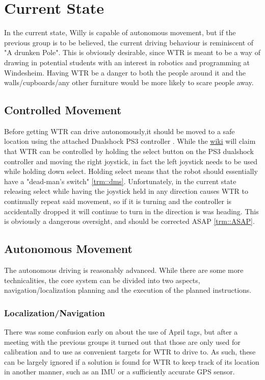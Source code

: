 \section{Current State}
In the current state, Willy is capable of autonomous movement, but if the previous group is to be believed, the current driving behaviour is reminiscent of "A drunken Pole".
This is obviously desirable, since WTR is meant to be a way of drawing in potential students with an interest in robotics and programming at Windesheim.
Having WTR be a danger to both the people around it and the walls/cupboards/any other furniture would be more likely to scare people away.

\subsection{Controlled Movement}
Before getting WTR can drive autonomously,it should be moved to a safe location using the attached Dualshock PS3 controller \cite{dualshock}.
While the \href{ https://windesheim-willy.github.io/WillyWiki/components/joystick.html}{wiki} will claim that WTR can be controlled by holding the select button on the PS3 dualshock controller and moving the right joystick, in fact the left joystick needs to be used while holding down select.
Holding select means that the robot should essentially have a "dead-man's switch" \ref{trm::dms}.
Unfortunately, in the current state releasing select while having the joystick held in any direction causes WTR to continually repeat said movement, so if it is turning and the controller is accidentally dropped it will continue to turn in the direction is was heading.
This is obviously a dangerous oversight, and should be corrected ASAP \ref{trm::ASAP}.

\subsection{Autonomous Movement}
The autonomous driving is reasonably advanced.
While there are some more technicalities, the core system can be divided into two aspects, navigation/localization planning and the execution of the planned instructions.


\subsubsection{Localization/Navigation}
There was some confusion early on about the use of April tags, but after a meeting with the previous groups it turned out that those are only used for calibration and to use as convenient targets for WTR to drive to.
As such, these can be largely ignored if a solution is found for WTR to keep track of its location in another manner, such as an IMU or a sufficiently accurate GPS sensor.


